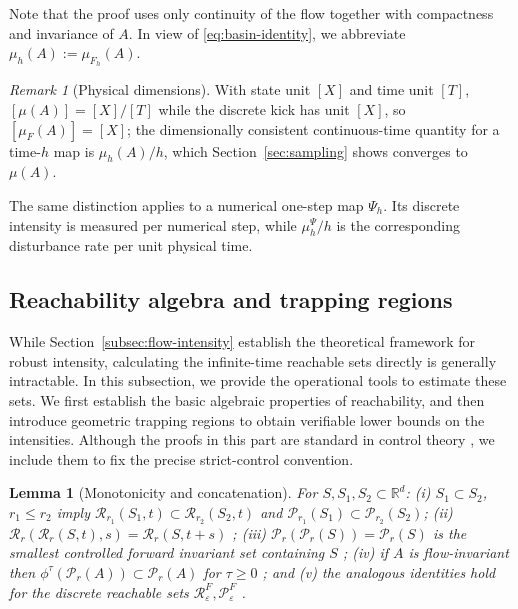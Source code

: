\documentclass[pdflatex,sn-mathphys-num]{sn-jnl}
\numberwithin{equation}{section}
\theoremstyle{thmstyleone}%
\newtheorem{lemma}[theorem]{Lemma}
\theoremstyle{definition}
\theoremstyle{remark}
\newtheorem{remark}[theorem]{Remark}
\begin{document}
Note that the proof uses only continuity of the flow together with compactness and invariance of $A$. In view of \eqref{eq:basin-identity}, we abbreviate $\mu_h(A):=\mu_{F_h}(A)$.

\begin{remark}[Physical dimensions]
\label{rem:dimensions}
With state unit $[X]$ and time unit $[T]$, $[\mu(A)]=[X]/[T]$ while the discrete kick has unit $[X]$, so $[\mu_F(A)]=[X]$; the dimensionally consistent continuous-time quantity for a time-$h$ map is $\mu_h(A)/h$, which Section~\ref{sec:sampling} shows converges to $\mu(A)$.
\end{remark}

The same distinction applies to a numerical one-step map $\Psi_h$. Its discrete intensity is measured per numerical step, while $\mu_h^\Psi/h$ is the corresponding disturbance rate per unit physical time.

\subsection{Reachability algebra and trapping regions}
\label{subsec:reachability-properties}

While Section~\ref{subsec:flow-intensity} establish the theoretical framework for robust intensity, calculating the infinite-time reachable sets directly is generally intractable. In this subsection, 
we provide the operational tools to estimate these sets. We first establish the basic algebraic properties of reachability, and then introduce geometric trapping regions to obtain verifiable lower bounds on the intensities.
Although the proofs in this part are standard in control theory \citep{colonius2000dynamics}, we include them to fix the precise strict-control convention.

\begin{lemma}[Monotonicity and concatenation]
\label{lem:reachability-algebra}
For $S,S_1,S_2\subset\mathbb R^d$: (i) $S_1\subset S_2$, $r_1\le r_2$ imply $\mathcal R_{r_1}(S_1,t)\subset\mathcal R_{r_2}(S_2,t)$ and $\mathcal P_{r_1}(S_1)\subset\mathcal P_{r_2}(S_2)$; (ii) $\mathcal R_r(\mathcal R_r(S,t),s)=\mathcal R_r(S,t+s)$ \label{eq:continuous-concatenation}; (iii) $\mathcal P_r(\mathcal P_r(S))=\mathcal P_r(S)$ is the smallest controlled forward invariant set containing $S$ \label{eq:reachable-idempotent}; (iv) if $A$ is flow-invariant then $\phi^\tau(\mathcal P_r(A))\subset\mathcal P_r(A)$ for $\tau\ge0$ \label{eq:flow-forward-invariance}; and (v) the analogous identities hold for the discrete reachable sets $\mathcal R^F_\varepsilon,\mathcal P^F_\varepsilon$
\label{eq:discrete-concatenation}.
\end{lemma}
\end{document}
